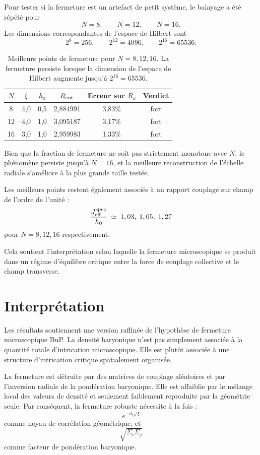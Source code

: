 \documentclass[11pt]{article}
\begin{document}
Pour tester si la fermeture est un artefact de petit système, le balayage a été répété pour
\[
N = 8,\qquad N = 12,\qquad N = 16.
\]
Les dimensions correspondantes de l'espace de Hilbert sont
\[
2^8 = 256,\qquad
2^{12} = 4096,\qquad
2^{16} = 65536.
\]

\begin{table}[h]
\centering
\begin{tabular}{c c c c c c}
\toprule
\(N\) & \(\xi\) & \(h_0\) & \(R_{\rm ent}\) & Erreur sur \(R_d\) & Verdict \\
\midrule
8  & 4,0 & 0,5 & 2,884991 & 3,83\% & fort \\
12 & 4,0 & 1,0 & 3,095187 & 3,17\% & fort \\
16 & 3,0 & 1,0 & 2,959983 & 1,33\% & fort \\
\bottomrule
\end{tabular}
\caption{
Meilleurs points de fermeture pour \(N = 8, 12, 16\).
La fermeture persiste lorsque la dimension de l'espace de Hilbert augmente jusqu'à
\(2^{16} = 65536\).
}
\end{table}

Bien que la fraction de fermeture ne soit pas strictement monotone avec \(N\), le phénomène persiste jusqu'à \(N = 16\), et la meilleure reconstruction de l'échelle radiale s'améliore à la plus grande taille testée.

Les meilleurs points restent également associés à un rapport couplage sur champ de l'ordre de l'unité :
\[
\frac{J_{\rm eff}^{\rm spec}}{h_0}
\;\simeq\;
1,03,\; 1,05,\; 1,27
\]
pour \(N = 8, 12, 16\) respectivement.

Cela soutient l'interprétation selon laquelle la fermeture microscopique se produit dans un régime d'équilibre critique entre la force de couplage collective et le champ transverse.

\section{Interprétation}

Les résultats soutiennent une version raffinée de l'hypothèse de fermeture microscopique BuP. La densité baryonique n'est pas simplement associée à la quantité totale d'intrication microscopique. Elle est plutôt associée à une structure d'intrication critique spatialement organisée.

La fermeture est détruite par des matrices de couplage aléatoires et par l'inversion radiale de la pondération baryonique. Elle est affaiblie par le mélange local des valeurs de densité et seulement faiblement reproduite par la géométrie seule. Par conséquent, la fermeture robuste nécessite à la fois :
\[
e^{-d_{ij}/\xi}
\]
comme noyau de corrélation géométrique, et
\[
\sqrt{\Sigma_i \Sigma_j}
\]
comme facteur de pondération baryonique.
\end{document}
